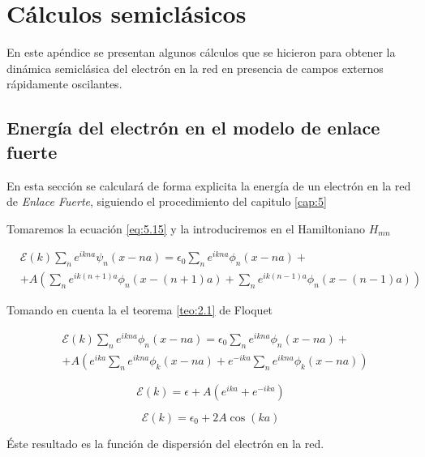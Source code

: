 \chapter{Cálculos semiclásicos}\label{apendice:B}

En este apéndice se presentan algunos cálculos que se hicieron para obtener la dinámica semiclásica del electrón en la red en presencia de campos externos rápidamente oscilantes.

\section{Energía del electrón en el modelo de enlace fuerte}\label{apendice:B.1}
En esta sección se calculará de forma explicita la energía de un electrón en la red de \textit{Enlace Fuerte}, siguiendo el procedimiento del capitulo \ref{cap:5}

Tomaremos la ecuación \ref{eq:5.15} y la introduciremos en el Hamiltoniano $H_{mn}$

\begin{equation}\label{eq:B.1}
\begin{split}
    &\mathcal{E}(k)\sum_ne^{ikna}\psi_{n}(x-na)=\epsilon_0\sum_n e^{ikna}\phi_{n}(x-na)+\\&+A(\sum_n e^{ik(n+1)a}\phi_{n}(x-(n+1)a)+\sum_n e^{ik(n-1)a}\phi_{n}(x-(n-1)a))
    \end{split}
\end{equation}

Tomando en cuenta la el teorema \ref{teo:2.1} de Floquet

\begin{equation}\label{eq:B.2}
\begin{split}
    &\mathcal{E}(k)\sum_ne^{ikna}\phi_{n}(x-na)=\epsilon_0\sum_ne^{ikna}\phi_{n}(x-na)+\\&+A\left(e^{ika}\sum_n e^{ikna}\phi_{k}(x-na)+e^{-ika}\sum_n e^{ikna}\phi_{k}(x-na)\right)
\end{split}
\end{equation}

\begin{equation}\label{eq:B.3}
    \mathcal{E}(k)=\epsilon+A\left(e^{ika}+e^{-ika}\right)
\end{equation}

\begin{equation}\label{eq:B.4}
    \mathcal{E}(k)=\epsilon_0+2A\cos(ka)
\end{equation}

Éste resultado es la función de dispersión del electrón en la red.

